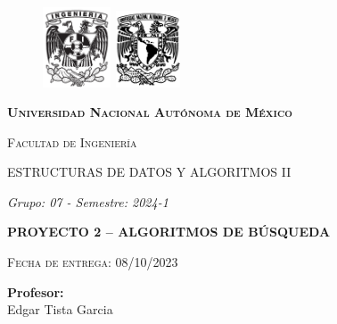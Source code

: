 {
  \setlength{\columnsep}{4mm}
  \setlength{\parindent}{0.5in}
  \setlength{\parskip}{1em}
  \renewcommand{\baselinestretch}{1.5}
  \setlength{\headheight}{33pt}

  \thispagestyle{empty}
			\begin{figure}[ht]
					 \includegraphics[width=2cm]{fi.jpg}
					 \label{escudoFI}
				\endminipage
					 \includegraphics[height = 2.25cm ,width=2cm]{unam.png}
					 \label{EscuoUNAM}
				 \endminipage
			 \end{figure}
			 
			 \vspace{0.1cm}
			 
			 \begin{center}
				 {\scshape\LARGE \textbf{Universidad Nacional Autónoma de México} \par}
				 {\scshape\Large Facultad de Ingeniería\par}
				 
				  {\Large ESTRUCTURAS DE DATOS Y ALGORITMOS II}
	 
				 \begin{center}
				 
				 {\LARGE \textit{Grupo: 07 - Semestre: 2024-1}}
	 
				 

				 {\LARGE\bfseries PROYECTO 2 – ALGORITMOS DE BÚSQUEDA\par}
	 
			 {\scshape\Large Fecha de entrega: 08/10/2023\par}	
	 
						 \LARGE	{ \textbf{Profesor:}}\\%
			 \large		{ Edgar Tista Garcia}
			 
			 \vspace{-0.5cm}	
			 

\end{center}
\end{center}}
